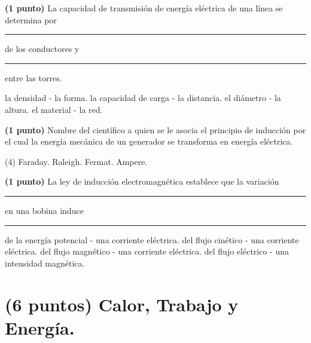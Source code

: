 \documentclass[12pt, letter]{exam}
\begin{document}
\begin{questions}
    \newpage

    \question \textbf{(1 punto)} La capacidad de transmisión de energía eléctrica de una línea se determina por \rule{2cm}{0.1mm} de los conductores y \rule{2cm}{0.1mm} entre las torres.
    \begin{multicols}{2}
    \begin{tasks}
        \task la densidad - la forma.
        \task la capacidad de carga - la distancia.
        \task el diámetro - la altura.
        \task el material - la red.
    \end{tasks}
    \end{multicols}
    \question \textbf{(1 punto)} Nombre del científico a quien se le asocia el principio de inducción por el cual la energía mecánica de un generador se transforma en energía eléctrica.
    \begin{tasks}(4)
        \task Faraday.
        \task Raleigh.
        \task Fermat.
        \task Ampere.
    \end{tasks}
    \question \textbf{(1 punto)} La ley de inducción electromagnética establece que la variación \rule{2cm}{0.1mm} en una bobina induce \rule{2cm}{0.1mm}
    \begin{tasks}
        \task de la energía potencial - una corriente eléctrica.
        \task del flujo cinético - una corriente eléctrica.
        \task del flujo magnético - una corriente eléctrica.
        \task del flujo eléctrico - una intensidad magnética.
    \end{tasks}
    
    \section{(6 puntos) Calor, Trabajo y Energía.}
    

\end{questions}
\end{document}
